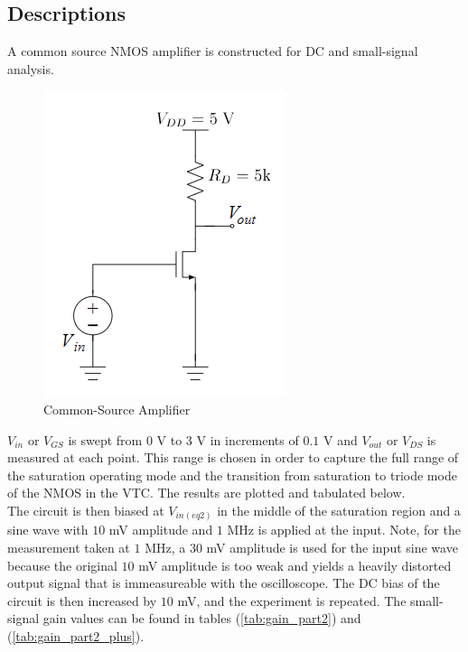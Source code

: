 \subsection{Descriptions}
A common source NMOS amplifier is constructed for DC and small-signal analysis.

\FloatBarrier

\begin{figure}[h!]
	\centering
	\includegraphics[scale=0.75]{./images/circuit_2.PNG}
	\caption{Common-Source Amplifier}
	\label{fig:circuit_2}
\end{figure}

\FloatBarrier

$V_{in}$ or $V_{GS}$ is swept from $0$ \si{\volt} to $3$ \si{\volt} in increments of $0.1$ \si{\volt} and $V_{out}$ or $V_{DS}$ is measured at each point.
This range is chosen in order to capture the full range of the saturation operating mode and the transition from saturation to triode mode of the NMOS in the VTC.
The results are plotted and tabulated below. \\

The circuit is then biased at $V_{in(eq2)}$ in the middle of the saturation region and a sine wave with $10$ \si{\milli\volt} amplitude and $1$ \si{\mega\hertz} is applied at the input. Note, for the measurement taken at $1$ \si{\mega\hertz}, a $30$ \si{\milli\volt} amplitude is used for the input sine wave because the original $10$ \si{\milli\volt} amplitude is too weak and yields a heavily distorted output signal that is immeasureable with the oscilloscope. The DC bias of the circuit is then increased by $10$ \si{\milli\volt}, and the experiment is repeated. The small-signal gain values can be found in tables (\ref{tab:gain_part2}) and (\ref{tab:gain_part2_plus}).

